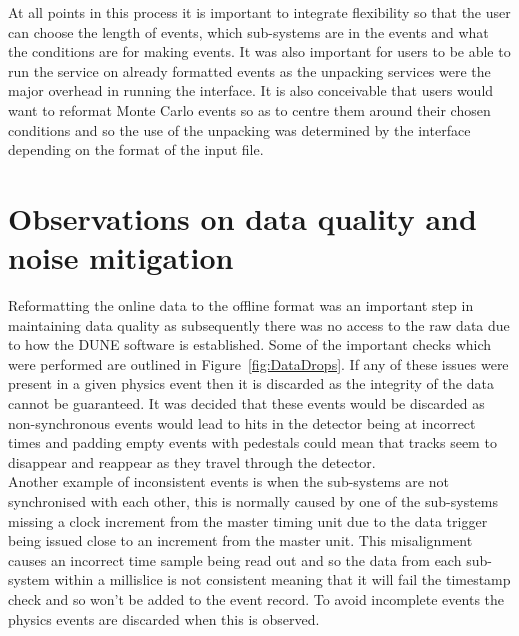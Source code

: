 At all points in this process it is important to integrate flexibility so that the user can choose the length of events, which sub-systems are in the events and what the conditions are for making events. It was also important for users to be able to run the service on already formatted events as the unpacking services were the major overhead in running the interface. It is also conceivable that users would want to reformat Monte Carlo events so as to centre them around their chosen conditions and so the use of the unpacking was determined by the interface depending on the format of the input file.

\section{Observations on data quality and noise mitigation} \label{All the noise} %
Reformatting the online data to the offline format was an important step in maintaining data quality as subsequently there was no access to the raw data due to how the DUNE software is established. Some of the important checks which were performed are outlined in Figure~\ref{fig:DataDrops}. If any of these issues were present in a given physics event then it is discarded as the integrity of the data cannot be guaranteed. It was decided that these events would be discarded as non-synchronous events would lead to hits in the detector being at incorrect times and padding empty events with pedestals could mean that tracks seem to disappear and reappear as they travel through the detector. \\

Another example of inconsistent events is when the sub-systems are not synchronised with each other, this is normally caused by one of the sub-systems missing a clock increment from the master timing unit due to the data trigger being issued close to an increment from the master unit. This misalignment causes an incorrect time sample being read out and so the data from each sub-system within a millislice is not consistent meaning that it will fail the timestamp check and so won't be added to the event record. To avoid incomplete events the physics events are discarded when this is observed. \\

